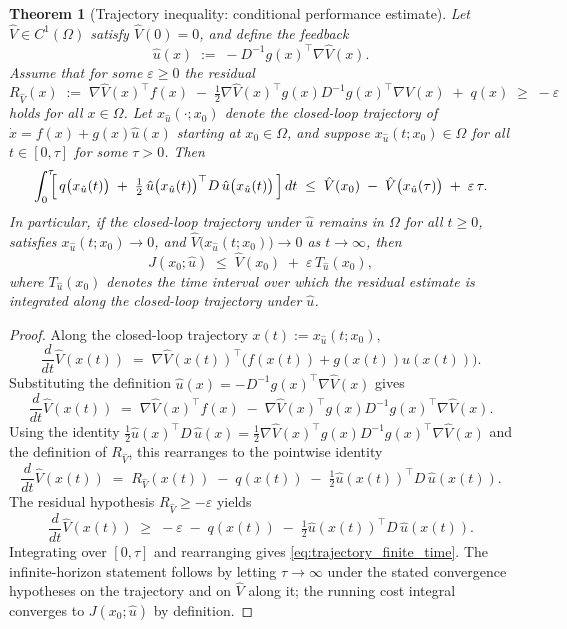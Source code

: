 \documentclass[11pt]{article}
\newtheorem{theorem}{Theorem}[section]
\begin{document}
\begin{theorem}[Trajectory inequality: conditional performance estimate]
\label{thm:trajectory_inequality}
\label{thm:suboptimality}
Let $\hat{V}\in C^1(\Omega)$ satisfy $\hat V(0)=0$, and define the feedback
\[
\hat u(x) \;:=\; -D^{-1} g(x)^\top \nabla \hat V(x).
\]
Assume that for some $\varepsilon \geq 0$ the residual
\begin{equation}
R_{\hat V}(x) \;:=\; \nabla \hat V(x)^\top f(x) \;-\; \tfrac{1}{2}\nabla \hat V(x)^\top g(x) D^{-1} g(x)^\top \nabla \hat V(x) \;+\; q(x) \;\geq\; -\varepsilon
\label{eq:residual}
\end{equation}
holds for all $x\in\Omega$. Let $x_{\hat u}(\cdot;x_0)$ denote the closed-loop trajectory of $\dot x = f(x)+g(x)\hat u(x)$ starting at $x_0\in\Omega$, and suppose $x_{\hat u}(t;x_0)\in\Omega$ for all $t\in[0,\tau]$ for some $\tau>0$. Then
\begin{equation}
\int_0^\tau \!\!\Bigl[\, q\bigl(x_{\hat u}(t)\bigr) \;+\; \tfrac{1}{2}\,\hat u\bigl(x_{\hat u}(t)\bigr)^\top D\,\hat u\bigl(x_{\hat u}(t)\bigr) \,\Bigr] \, dt
\;\leq\; \hat V(x_0) \;-\; \hat V\bigl(x_{\hat u}(\tau)\bigr) \;+\; \varepsilon\,\tau.
\label{eq:trajectory_finite_time}
\end{equation}
In particular, if the closed-loop trajectory under $\hat u$ remains in $\Omega$ for all $t\geq 0$, satisfies $x_{\hat u}(t;x_0)\to 0$, and $\hat V\bigl(x_{\hat u}(t;x_0)\bigr)\to 0$ as $t\to\infty$, then
\begin{equation}
J(x_0;\hat u) \;\leq\; \hat V(x_0) \;+\; \varepsilon\, T_{\hat u}(x_0),
\label{eq:trajectory_inf_time}
\end{equation}
where $T_{\hat u}(x_0)$ denotes the time interval over which the residual estimate is integrated along the closed-loop trajectory under $\hat u$.
\end{theorem}

\begin{proof}
Along the closed-loop trajectory $x(t):=x_{\hat u}(t;x_0)$,
\[
\frac{d}{dt}\hat V(x(t)) \;=\; \nabla\hat V(x(t))^\top\bigl(f(x(t)) + g(x(t))\hat u(x(t))\bigr).
\]
Substituting the definition $\hat u(x) = -D^{-1}g(x)^\top \nabla\hat V(x)$ gives
\[
\frac{d}{dt}\hat V(x(t)) \;=\; \nabla\hat V(x)^\top f(x) \;-\; \nabla\hat V(x)^\top g(x) D^{-1} g(x)^\top \nabla\hat V(x).
\]
Using the identity $\tfrac12 \hat u(x)^\top D\,\hat u(x) = \tfrac12 \nabla\hat V(x)^\top g(x) D^{-1} g(x)^\top \nabla\hat V(x)$ and the definition of $R_{\hat V}$, this rearranges to the pointwise identity
\[
\frac{d}{dt}\hat V(x(t)) \;=\; R_{\hat V}(x(t)) \;-\; q(x(t)) \;-\; \tfrac12 \hat u(x(t))^\top D\,\hat u(x(t)).
\]
The residual hypothesis $R_{\hat V}\geq -\varepsilon$ yields
\[
\frac{d}{dt}\hat V(x(t)) \;\geq\; -\varepsilon \;-\; q(x(t)) \;-\; \tfrac12 \hat u(x(t))^\top D\,\hat u(x(t)).
\]
Integrating over $[0,\tau]$ and rearranging gives \eqref{eq:trajectory_finite_time}. The infinite-horizon statement follows by letting $\tau\to\infty$ under the stated convergence hypotheses on the trajectory and on $\hat V$ along it; the running cost integral converges to $J(x_0;\hat u)$ by definition.
\end{proof}
\end{document}
